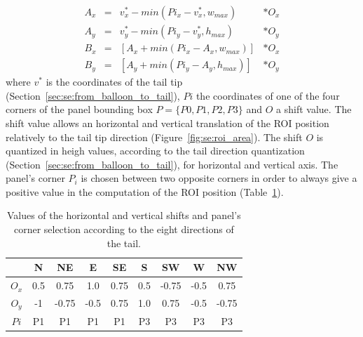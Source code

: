\begin{equation}
  \label{eq:se:roi_position_around_balloon}
  \begin{array}{rccl} 
	  A_x & = & v^*_x - min(Pi_x - v^*_x, w_{max}) & * O_x \\ 
	  A_y & = & v^*_y - min(Pi_y - v^*_y, h_{max}) & * O_y \\ 
	  B_x & = & \left[ A_x + min(Pi_x - A_x, w_{max}) \right] & * O_x \\ 
	  B_y & = & \left[ A_y + min(Pi_y - A_y, h_{max}) \right] & * O_y
  \end{array} 
\end{equation}
where $v^*$ is the coordinates of the tail tip (Section~\ref{sec:se:from_balloon_to_tail}), $Pi$ the coordinates of one of the four corners of the panel bounding box $P=\{P0, P1, P2, P3\}$ and $O$ a shift value.
The shift value allows an horizontal and vertical translation of the ROI position relatively to the tail tip direction (Figure~\ref{fig:se:roi_area}).
The shift $O$ is quantized in heigh values, according to the tail direction quantization (Section~\ref{sec:se:from_balloon_to_tail}), for horizontal and vertical axis.
The panel's corner $P_i$ is chosen between two opposite corners in order to always give a positive value in the computation of the ROI position (Table~\ref{tab:se:offset_panel_corner}).

  \begin{table}[ht]
    \normalsize

    \centering
    \caption{Values of the horizontal and vertical shifts and panel's corner selection according to the eight directions of the tail.}
    \setlength{\tabcolsep}{.45em}
    \begin{tabular}{|c|c|c|c|c|c|c|c|c|}

          \hline
	      &  N  & NE  & E  & SE & S & SW & W & NW   \\
	      \hline
	      $O_x$   & 0.5  & 0.75 & 1.0  & 0.75 & 0.5 & -0.75& -0.5 & 0.75  \\
	      \hline
	      $O_y$   & -1   & -0.75& -0.5 & 0.75 & 1.0 & 0.75 & -0.5 & -0.75  \\
	      \hline
	      $Pi$    & P1   & P1   & P1   & P1   & P3  & P3   & P3   & P3   \\
          \hline
        \end{tabular}
    \label{tab:se:offset_panel_corner}
  \end{table}%


